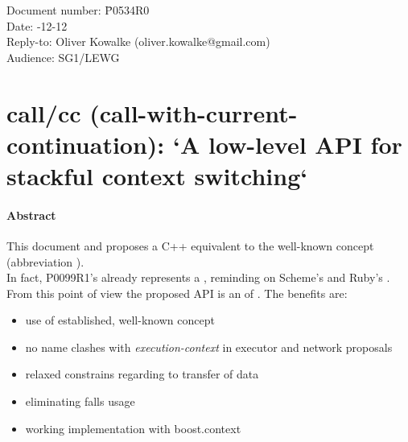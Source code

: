\documentclass[fontsize=10pt,paper=A4,pagesize,DIV=15]{scrartcl}
\begin{document}
\small
\begin{tabbing}
    Document number: \= P0534R0\\
    Date:            -12-12\\
    Reply-to:        \> Oliver Kowalke (oliver.kowalke@gmail.com)\\
    Audience:        \> SG1/LEWG\\
\end{tabbing}

\section*{call/cc (call-with-current-continuation): `A low-level API for stackful context switching`}


\tableofcontents


\paragraph*{Abstract}
This document  and proposes a C++
equivalent to the well-known concept \callcc (abbreviation \cc).\\
In fact, P0099R1's \ectx already represents a ,
reminding on Scheme's\cite{schemecallcc} and Ruby's\cite{rubycallcc} \cc.
From this point of view the proposed API is an  of \ectx. The
benefits are:
\begin{itemize}
    \item   use of established, well-known concept
    \item   no name clashes with \emph{execution-context} in
            executor and network proposals
    \item   relaxed constrains regarding to transfer of data
    \item   eliminating falls usage
    \item   working implementation with boost.context\cite{bcontext}
\end{itemize}













\end{document}
